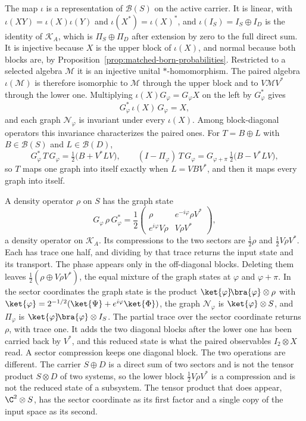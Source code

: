 The map $\iota$ is a representation of $\mathcal B(S)$ on the active carrier. It is linear, with $\iota(XY)=\iota(X)\iota(Y)$ and $\iota(X^*)=\iota(X)^*$, and $\iota(I_S)=I_S\oplus I_D$ is the identity of $\mathcal K_A$, which is $\Pi_S\oplus\Pi_D$ after extension by zero to the full direct sum. It is injective because $X$ is the upper block of $\iota(X)$, and normal because both blocks are, by Proposition~\ref{prop:matched-born-probabilities}. Restricted to a selected algebra $\mathcal M$ it is an injective unital $*$-homomorphism. The paired algebra $\iota(\mathcal M)$ is therefore isomorphic to $\mathcal M$ through the upper block and to $V\mathcal MV^*$ through the lower one. Multiplying $\iota(X)G_\varphi=G_\varphi X$ on the left by $G_\varphi^*$ gives
\begin{equation}
 G_\varphi^*\,\iota(X)\,G_\varphi=X ,
 \label{eq:graph-paired-compression}
\end{equation}
and each graph $\mathcal N_\varphi$ is invariant under every $\iota(X)$. Among block-diagonal operators this invariance characterizes the paired ones. For $T=B\oplus L$ with $B\in\mathcal B(S)$ and $L\in\mathcal B(D)$,
\[
 G_\varphi^*\,T\,G_\varphi=\tfrac12\bigl(B+V^*LV\bigr),\qquad
 (I-\Pi_\varphi)\,T\,G_\varphi=G_{\varphi+\pi}\,\tfrac12\bigl(B-V^*LV\bigr),
\]
so $T$ maps one graph into itself exactly when $L=VBV^*$, and then it maps every graph into itself.

A density operator $\rho$ on $S$ has the graph state
\begin{equation}
 G_\varphi\,\rho\,G_\varphi^*
 =\frac12\begin{pmatrix}\rho&e^{-i\varphi}\rho V^*\\ e^{i\varphi}V\rho&V\rho V^*\end{pmatrix},
 \label{eq:graph-density-blocks}
\end{equation}
a density operator on $\mathcal K_A$. Its compressions to the two sectors are $\tfrac12\rho$ and $\tfrac12V\rho V^*$. Each has trace one half, and dividing by that trace returns the input state and its transport. The phase appears only in the off-diagonal blocks. Deleting them leaves $\tfrac12(\rho\oplus V\rho V^*)$, the equal mixture of the graph states at $\varphi$ and $\varphi+\pi$. In the sector coordinates the graph state is the product $\ket{\varphi}\!\bra{\varphi}\otimes\rho$ with $\ket{\varphi}=2^{-1/2}(\ket{\Psi}+e^{i\varphi}\ket{\Phi})$, the graph $\mathcal N_\varphi$ is $\ket{\varphi}\otimes S$, and $\Pi_\varphi$ is $\ket{\varphi}\!\bra{\varphi}\otimes I_S$. The partial trace over the sector coordinate returns $\rho$, with trace one. It adds the two diagonal blocks after the lower one has been carried back by $V^*$, and this reduced state is what the paired observables $I_2\otimes X$ read. A sector compression keeps one diagonal block. The two operations are different. The carrier $S\oplus D$ is a direct sum of two sectors and is not the tensor product $S\otimes D$ of two systems, so the lower block $\tfrac12V\rho V^*$ is a compression and is not the reduced state of a subsystem. The tensor product that does appear, $\C^2\otimes S$, has the sector coordinate as its first factor and a single copy of the input space as its second.

